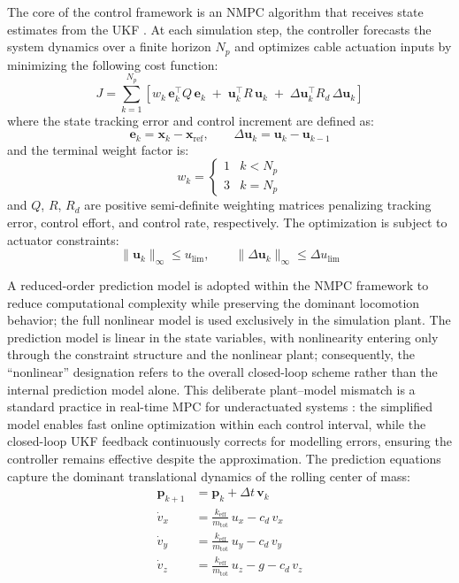 \documentclass[conference]{IEEEtran}
\begin{document}
The core of the control framework is an NMPC algorithm that receives state
estimates from the UKF \cite{b6,b10}. At each simulation step, the controller
forecasts the system dynamics over a finite horizon $N_p$ and optimizes cable
actuation inputs by minimizing the following cost function:
%
\begin{equation}
\label{eq:nmpc_cost}
J = \sum_{k=1}^{N_p} \left[
  w_k\,\mathbf{e}_k^\top Q\,\mathbf{e}_k
  \;+\; \mathbf{u}_k^\top R\,\mathbf{u}_k
  \;+\; \Delta\mathbf{u}_k^\top R_d\,\Delta\mathbf{u}_k
\right]
\end{equation}
%
where the state tracking error and control increment are defined as:
%
\begin{equation}
\label{eq:track_err}
\mathbf{e}_k = \mathbf{x}_k - \mathbf{x}_{\mathrm{ref}}, \qquad
\Delta\mathbf{u}_k = \mathbf{u}_k - \mathbf{u}_{k-1}
\end{equation}
%
and the terminal weight factor is:
%
\begin{equation}
\label{eq:term_weight}
w_k =
\begin{cases}
1 & k < N_p \\[3pt]
3 & k = N_p
\end{cases}
\end{equation}
%
and $Q$, $R$, $R_d$ are positive semi-definite weighting matrices penalizing
tracking error, control effort, and control rate, respectively. The
optimization is subject to actuator constraints:
%
\begin{equation}
\label{eq:nmpc_constraints}
\|\mathbf{u}_k\|_\infty \leq u_{\mathrm{lim}}, \qquad
\|\Delta\mathbf{u}_k\|_\infty \leq \Delta u_{\mathrm{lim}}
\end{equation}

A reduced-order prediction model is adopted within the NMPC framework to
reduce computational complexity while preserving the dominant locomotion
behavior; the full nonlinear model is used exclusively in the simulation plant.
The prediction model is linear in the state variables, with nonlinearity
entering only through the constraint structure and the nonlinear plant;
consequently, the ``nonlinear'' designation refers to the overall closed-loop
scheme rather than the internal prediction model alone.
This deliberate plant--model mismatch is a standard practice in real-time MPC
for underactuated systems \cite{b10}: the simplified model enables fast
online optimization within each control interval, while the closed-loop UKF
feedback continuously corrects for modelling errors, ensuring the controller
remains effective despite the approximation.
The prediction equations capture the dominant translational dynamics of the
rolling center of mass:
%
\begin{align}
\mathbf{p}_{k+1} &= \mathbf{p}_k + \Delta t\,\mathbf{v}_k
    \label{eq:nmpc_pos} \\[4pt]
\dot{v}_{x} &= \frac{k_{\mathrm{eff}}}{m_{\mathrm{tot}}}\,u_x - c_d\,v_x
    \label{eq:nmpc_vx} \\[4pt]
\dot{v}_{y} &= \frac{k_{\mathrm{eff}}}{m_{\mathrm{tot}}}\,u_y - c_d\,v_y
    \label{eq:nmpc_vy} \\[4pt]
\dot{v}_{z} &= \frac{k_{\mathrm{eff}}}{m_{\mathrm{tot}}}\,u_z - g - c_d\,v_z
    \label{eq:nmpc_predict}
\end{align}
\end{document}
